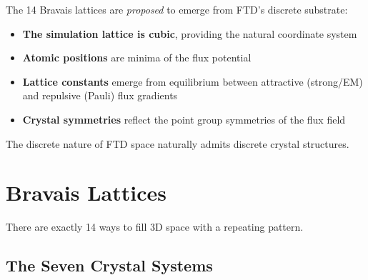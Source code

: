 \documentclass[
  11pt,
  letterpaper,
  twoside,
  openright]{book}
\providecommand{\tightlist}{%
  \setlength{\itemsep}{0pt}\setlength{\parskip}{0pt}}
\begin{document}
\begin{tcolorbox}[enhanced jigsaw, coltitle=black, colbacktitle=quarto-callout-note-color!10!white, toprule=.15mm, colframe=quarto-callout-note-color-frame, arc=.35mm, opacityback=0, bottomtitle=1mm, toptitle=1mm, breakable, colback=white, titlerule=0mm, opacitybacktitle=0.6, title=\textcolor{quarto-callout-note-color}{\faInfo}\hspace{0.5em}{How FTD Proposes Crystal Structure {[}CONJECTURE{]}}, rightrule=.15mm, bottomrule=.15mm, leftrule=.75mm, left=2mm]

The 14 Bravais lattices are \emph{proposed} to emerge from FTD's
discrete substrate:

\begin{itemize}
\tightlist
\item
  \textbf{The simulation lattice is cubic}, providing the natural
  coordinate system
\item
  \textbf{Atomic positions} are minima of the flux potential
\item
  \textbf{Lattice constants} emerge from equilibrium between attractive
  (strong/EM) and repulsive (Pauli) flux gradients
\item
  \textbf{Crystal symmetries} reflect the point group symmetries of the
  flux field
\end{itemize}

The discrete nature of FTD space naturally admits discrete crystal
structures.

\end{tcolorbox}

\section{Bravais Lattices}\label{bravais-lattices}

There are exactly 14 ways to fill 3D space with a repeating pattern.

\subsection{The Seven Crystal Systems}\label{the-seven-crystal-systems}
\end{document}

